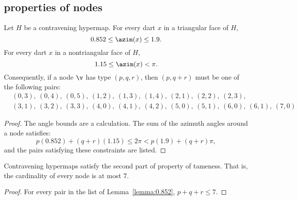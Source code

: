 \subsection{properties of nodes}
%



\begin{lemma}[] \label{lemma:0.852}
Let $H$ be a contravening
hypermap. For every dart $x$ in a triangular face of $H$,
\begin{displaymath}0.852\le \azim(x)\le 1.9.\end{displaymath}
For every dart $x$ in a nontriangular face of $H$, 
\begin{displaymath}1.15\le\azim(x)<\pi.\end{displaymath}
%
%
Consequently, if a node $\v$ has type $(p,q,r)$, then $(p,q+r)$ must
be one of the following pairs:
\begin{displaymath}
\begin{array}{lll}
  &(0,3),~(0,4),~(0,5),~(1,2),~(1,3),~(1,4),~(2,1),~(2,2),~(2,3),\\
  &(3,1),~(3,2),~(3,3),~(4,0),~(4,1),~(4,2),
  ~(5,0),~(5,1),~(6,0),~(6,1),~(7,0)
\end{array}
\end{displaymath}
\end{lemma}
%

\begin{proof}
The angle bounds are a calculation.  The sum of the azimuth angles
around a node satisfies:
\begin{displaymath}
p (0.852) + (q+r) (1.15) \le 2\pi < p (1.9) + (q+r) \pi,
\end{displaymath}
and the pairs satisfying these constraints are listed.
\end{proof}

\begin{lemma}[]\label{lemma:node-upper}
Contravening hypermaps satisfy the second part of property 
of tameness.  That is, the cardinality of every
node is at most $7$.
\end{lemma}

\begin{proof}  For every pair in the list of Lemma~\ref{lemma:0.852},  $p+q+r\le 7$.
\end{proof}




